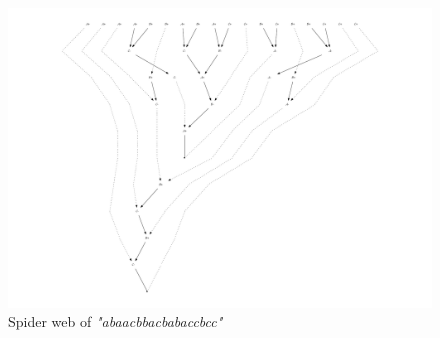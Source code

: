 \documentclass[nonatbib,numbers,10pt]{llncs}
\newcommand{\w}[1]{\textit{"#1"}}
\begin{document}
\begin{figure}
\begin{center}
\includegraphics[width=\textwidth]{web.pdf}
\caption{Spider web of \w{abaacbbacbabaccbcc}}
\label{fig:web}
\end{center}
\end{figure}
\end{document}
